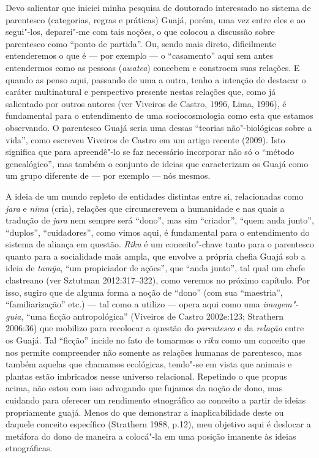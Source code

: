 Devo salientar que iniciei minha pesquisa de doutorado interessado no
sistema de parentesco (categorias, regras e práticas) Guajá, porém, uma
vez entre eles e ao segui"-los, deparei"-me com tais noções, o que colocou
a discussão sobre parentesco como ``ponto de partida''. Ou, sendo mais
direto, dificilmente entenderemos o que é --- por exemplo --- o
``casamento'' aqui sem antes entendermos como as pessoas (\emph{awatea})
concebem e constroem suas relações. E quando as penso aqui, passando de
uma a outra, tenho a intenção de destacar o caráter multinatural e
perspectivo presente nestas relações que, como já salientado por outros
autores (ver Viveiros de Castro, 1996, Lima, 1996), é fundamental para o
entendimento de uma sociocosmologia como esta que estamos observando. O
parentesco Guajá seria uma dessas ``teorias não"-biológicas sobre a
vida'', como escreveu Viveiros de Castro em um artigo recente (2009).
Isto significa que para apreendê"-lo se faz necessário incorporar não só
o ``método genealógico'', mas também o conjunto de ideias que
caracterizam os Guajá como um grupo diferente de --- por exemplo --- nós
mesmos.

A ideia de um mundo repleto de entidades distintas entre si,
relacionadas como \emph{jara} e \emph{nima} (cria), relações que
circunscrevem a humanidade e nas quais a tradução de \emph{jara} nem
sempre será ``dono'', mas sim ``criador'', ``quem anda junto'', ``duplos'',
``cuidadores'', como vimos aqui, é fundamental para o entendimento do
sistema de aliança em questão. \emph{Riku} é um conceito"-chave tanto
para o parentesco quanto para a socialidade mais ampla, que envolve a
própria chefia Guajá sob a ideia de \emph{tamỹa}, ``um propiciador de
ações'', que ``anda junto'', tal qual um chefe clastreano (ver Sztutman
2012:317--322), como veremos no próximo capítulo. Por isso, sugiro que de
alguma forma a noção de ``dono'' (com sua ``maestria'', ``familiarização''
etc.) --- tal como a utilizo --- opera aqui como uma \emph{imagem"-guia},
``uma ficção antropológica'' (Viveiros de Castro 2002e:123; Strathern
2006:36) que mobilizo para recolocar a questão do \emph{parentesco} e da
\emph{relação} entre os Guajá. Tal ``ficção'' incide no fato de tomarmos o
\emph{riku} como um conceito que nos permite compreender não somente as
relações humanas de parentesco, mas também aquelas que chamamos
ecológicas, tendo"-se em vista que animais e plantas estão imbricados
nesse universo relacional. Repetindo o que propus acima, não estou com
isso advogando que fujamos da noção de dono, mas cuidando para oferecer
um rendimento etnográfico ao conceito a partir de ideias propriamente
guajá. Menos do que demonstrar a inaplicabilidade deste ou daquele
conceito específico (Strathern 1988, p.12), meu objetivo aqui é deslocar
a metáfora do dono de maneira a colocá"-la em uma posição imanente às
ideias etnográficas.

